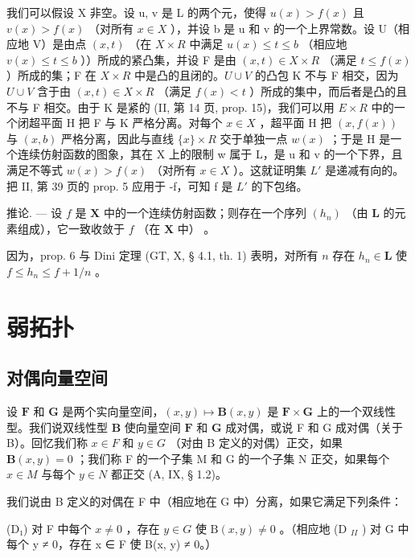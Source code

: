 我们可以假设 X 非空。设 u, v 是 L 的两个元，使得 \(u(x) > f(x)\) 且 \(v(x) > f(x)\) （对所有 \(x \in X\) ），并设 b 是 u 和 v 的一个上界常数。设 U（相应地 V）是由点 \((x, t)\) （在 \(X \times R\) 中满足 \(u(x) \leqslant t \leqslant b\) （相应地 \(v(x) \leqslant t \leqslant b\) ））所成的紧凸集，并设 F 是由 \((x, t) \in X \times R\) （满足 \(t \leqslant f(x)\) ）所成的集；F 在 \(X \times R\) 中是凸的且闭的。\(U \cup V\) 的凸包 K 不与 F 相交，因为 \(U \cup V\) 含于由 \((x, t) \in X \times R\) （满足 \(f(x) < t\) ）所成的集中，而后者是凸的且不与 F 相交。由于 K 是紧的 (II, 第 14 页, prop. 15)，我们可以用 \(E \times R\) 中的一个闭超平面 H 把 F 与 K 严格分离。对每个 \(x \in X\) ，超平面 H 把 \((x, f(x))\) 与 \((x, b)\) 严格分离，因此与直线 \(\{x\} \times R\) 交于单独一点 \(w(x)\) ；于是 H 是一个连续仿射函数的图象，其在 X 上的限制 w 属于 L，是 u 和 v 的一个下界，且满足不等式 \(w(x) > f(x)\) （对所有 \(x \in X\) ）。这就证明集 \(L'\) 是递减有向的。把 II, 第 39 页的 prop. 5 应用于 -f，可知 f 是 \(L'\) 的下包络。

推论. --- 设 \(f\) 是 \(\mathbf{X}\) 中的一个连续仿射函数；则存在一个序列 \((h_n)\) （由 \(\mathbf{L}\) 的元素组成），它一致收敛于 \(f\) （在 \(\mathbf{X}\) 中） 。

因为，prop. 6 与 Dini 定理 (GT, X, § 4.1, th. 1) 表明，对所有 \(n\) 存在 \(h_n \in \mathbf{L}\) 使 \(f \leqslant h_n \leqslant f + 1/n\) 。

\section{弱拓扑}

\subsection{对偶向量空间}

设 \(\mathbf{F}\) 和 \(\mathbf{G}\) 是两个实向量空间，\((x, y) \mapsto \mathbf{B}(x, y)\) 是 \(\mathbf{F} \times \mathbf{G}\) 上的一个双线性型。我们说双线性型 \(\mathbf{B}\) 使向量空间 \(\mathbf{F}\) 和 \(\mathbf{G}\) 成对偶，或说 F 和 G 成对偶（关于 B）。回忆我们称 \(x \in F\) 和 \(y \in G\) （对由 B 定义的对偶）正交，如果 \(\mathbf{B}(x, y) = 0\) ；我们称 F 的一个子集 M 和 G 的一个子集 N 正交，如果每个 \(x \in M\) 与每个 \(y \in N\) 都正交 (A, IX, § 1.2)。

我们说由 B 定义的对偶在 F 中（相应地在 G 中）分离，如果它满足下列条件：

(D₁) 对 F 中每个 \(x \neq 0\) ，存在 \(y \in G\) 使 \(\mathrm{B}(x, y) \neq 0\) 。（相应地 (D \(_{II}\) ) 对 G 中每个 y ≠ 0，存在 x ∈ F 使 B(x, y) ≠ 0。）

